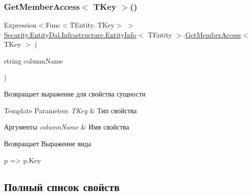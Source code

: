 \subsubsection{\texorpdfstring{Get\+Member\+Access$<$ T\+Key $>$()}{GetMemberAccess< TKey >()}\hspace{0.1cm}{\footnotesize\ttfamily [2/2]}}
{\footnotesize\ttfamily Expression$<$Func$<$T\+Entity, T\+Key$>$ $>$ \hyperlink{class_security_1_1_entity_dal_1_1_infrastructure_1_1_entity_info}{Security.\+Entity\+Dal.\+Infrastructure.\+Entity\+Info}$<$ T\+Entity $>$.\hyperlink{class_security_1_1_entity_dal_1_1_infrastructure_1_1_entity_info_a00fbeaff893bc743c782586ae88e5070}{Get\+Member\+Access}$<$ T\+Key $>$ (\begin{DoxyParamCaption}\item[{string}]{column\+Name }\end{DoxyParamCaption})}



Возвращает выражение для свойства сущности 


\begin{DoxyTemplParams}{Template Parameters}
{\em T\+Key} & Тип свойства\\
\hline
\end{DoxyTemplParams}

\begin{DoxyParams}{Аргументы}
{\em column\+Name} & Имя свойства\\
\hline
\end{DoxyParams}
\begin{DoxyReturn}{Возвращает}
Выражение вида 
\begin{DoxyCode}
p => p.Key
\end{DoxyCode}

\end{DoxyReturn}


\subsection{Полный список свойств}
\mbox{\label{class_security_1_1_entity_dal_1_1_infrastructure_1_1_entity_info_ab325cd6803fd1ed5f5e57792b83ca098}} 
